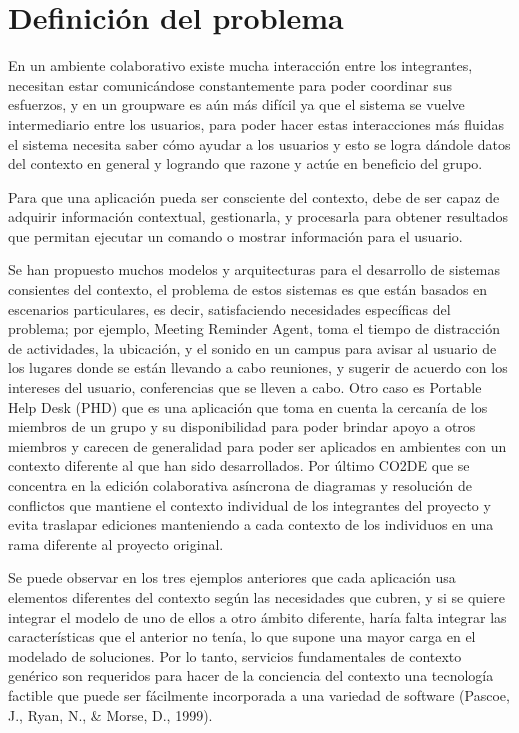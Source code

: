 \section{Definici\'on del problema}
En un ambiente colaborativo existe mucha interacci\'on entre los integrantes, necesitan estar comunic\'andose  constantemente para poder coordinar sus esfuerzos, y en un groupware es a\'un m\'as dif\'icil ya que el sistema se vuelve intermediario entre los usuarios,  para poder hacer estas interacciones m\'as fluidas el sistema necesita saber c\'omo ayudar a los usuarios y esto se logra d\'andole datos del contexto en general y logrando que razone y act\'ue  en beneficio del grupo.

Para que una aplicaci\'on pueda ser consciente del contexto, debe de ser capaz de adquirir informaci\'on contextual, gestionarla, y procesarla para obtener resultados que permitan ejecutar un comando o mostrar informaci\'on para el usuario. 

Se han propuesto muchos modelos y arquitecturas para el desarrollo de sistemas consientes del contexto, el problema de estos sistemas es que est\'an basados en escenarios particulares, es decir, satisfaciendo necesidades espec\'ificas del problema; por ejemplo, Meeting Reminder Agent\cite{anhalt2001toward}, toma el tiempo de distracci\'on de actividades, la ubicaci\'on, y el sonido en un campus para avisar al usuario de los lugares donde se est\'an llevando a cabo reuniones, y sugerir de acuerdo con los intereses del usuario, conferencias que se lleven a cabo. Otro caso es Portable Help Desk (PHD) \cite{anhalt2001toward} que es una aplicaci\'on que toma en cuenta la cercan\'ia de los miembros de un grupo y su disponibilidad para poder brindar apoyo a otros miembros y carecen de generalidad para poder ser aplicados en ambientes con un contexto diferente al que han sido desarrollados. Por \'ultimo CO2DE \cite{schmidt1992taking} que se concentra en la edici\'on colaborativa as\'incrona de diagramas y resoluci\'on de conflictos que mantiene el contexto individual de los integrantes del proyecto y evita traslapar ediciones manteniendo a cada contexto de los individuos en una rama diferente al proyecto original.

Se puede observar en los tres ejemplos anteriores que cada aplicaci\'on usa elementos diferentes del contexto seg\'un las necesidades que cubren, y si se quiere integrar el modelo de uno de ellos a otro \'ambito diferente, har\'ia falta integrar las caracter\'isticas que el anterior no ten\'ia, lo que supone una mayor carga en el modelado de soluciones. Por lo tanto, servicios fundamentales de contexto gen\'erico son requeridos para hacer de la conciencia del contexto una tecnolog\'ia factible que puede ser f\'acilmente incorporada a una variedad de software (Pascoe, J., Ryan, N., \& Morse, D., 1999).
 
